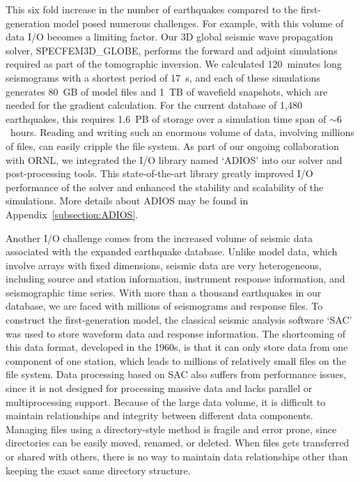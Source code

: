 This six fold increase in the number of earthquakes compared to the first-generation model
posed numerous challenges.
For example, with this volume of data I/O becomes a limiting factor.
Our 3D global seismic wave propagation solver, SPECFEM3D\_GLOBE,
performs the forward and adjoint simulations required as part of the tomographic inversion.
We calculated 120~minutes long seismograms with a shortest period of 17~s,
and each of these simulations generates 80~GB of model files and 1~TB of wavefield snapshots,
which are needed for the gradient calculation.
For the current database of 1,480 earthquakes, this requires 1.6~PB of storage over a simulation time span of $\sim6$~hours.
Reading and writing such an enormous volume of data, involving millions of files, can easily cripple the file system.
As part of our ongoing collaboration with ORNL,
we integrated the I/O library named `ADIOS' into our solver and post-processing tools.
This state-of-the-art library greatly improved I/O performance of the solver and enhanced the stability and scalability of the simulations.
More details about ADIOS may be found in Appendix~\ref{subsection:ADIOS}.

Another I/O challenge comes from the increased volume of seismic data associated with the expanded earthquake database.
Unlike model data, which involve arrays with fixed dimensions,
seismic data are very heterogeneous, including source and station information,
instrument response information, and seismographic time series.
With more than a thousand earthquakes in our database, we are faced with millions
of seismograms and response files.
To construct the first-generation model,
the classical seismic analysis software `SAC' was used to store waveform data and
response information.
The shortcoming of this data format,
developed in the 1960s, is that it can only store 
data from one component of one station, which leads to millions of relatively small files on
the file system.
Data processing based on SAC also suffers from performance issues, since it is
not designed for processing massive data and lacks parallel
or multiprocessing support.
Because of the large data volume,
it is difficult to maintain relationships and integrity between
different data components.
Managing files using a directory-style method is fragile and
error prone, since directories
can be easily moved, renamed, or deleted.
When files gets transferred or shared with others, there is no way to maintain
data relationships other than keeping the exact same directory structure.

